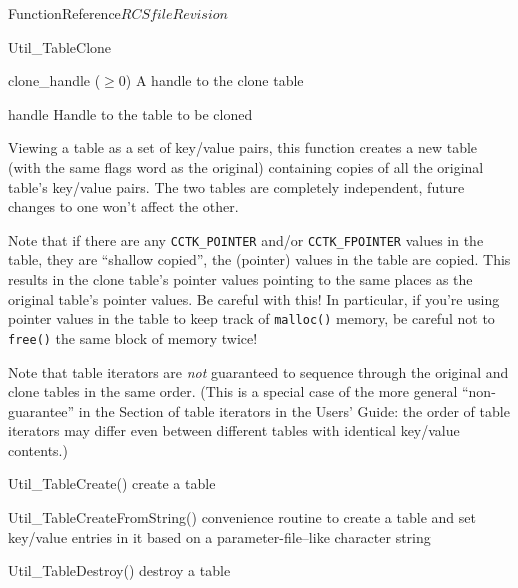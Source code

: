\begin{cactuspart}{FunctionReference}{$RCSfile$}{$Revision$}
\begin{FunctionDescription}{Util\_TableClone}
\begin{ResultSection}
\begin{Result}{clone\_handle ($\ge 0$)}
A handle to the clone table
\end{Result}
\end{ResultSection}

\begin{ParameterSection}
\begin{Parameter}{handle}
Handle to the table to be cloned
\end{Parameter}
\end{ParameterSection}

\begin{Discussion}
Viewing a table as a set of key/value pairs, this function creates
a new table (with the same flags word as the original) containing
copies of all the original table's key/value pairs.  The two tables
are completely independent, \ie{} future changes to one won't affect
the other.

Note that if there are any \verb|CCTK_POINTER| and/or \verb|CCTK_FPOINTER|
values in the table, they are ``shallow copied'', \ie{} the (pointer)
values in the table are copied.  This results in the clone table's
pointer values pointing to the same places as the original table's
pointer values.  Be careful with this!  In particular,
if you're using pointer values in the table to keep track of
\verb|malloc()| memory, be careful not to \verb|free()|
the same block of memory twice!

Note that table iterators are {\em not\/} guaranteed to sequence
through the original and clone tables in the same order.  (This
is a special case of the more general ``non-guarantee'' in
the Section of table iterators in the Users' Guide:
the order of table iterators may differ even between different
tables with identical key/value contents.)
\end{Discussion}

\begin{SeeAlsoSection}
\begin{SeeAlso}{Util\_TableCreate()}
create a table
\end{SeeAlso}
\begin{SeeAlso}{Util\_TableCreateFromString()}
convenience routine to create a table and set key/value entries
in it based on a parameter-file--like character string
\end{SeeAlso}
\begin{SeeAlso}{Util\_TableDestroy()}
destroy a table
\end{SeeAlso}
\end{SeeAlsoSection}


\end{FunctionDescription}
\end{cactuspart}
